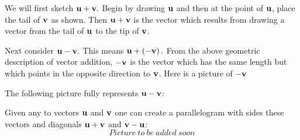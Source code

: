 \begin{solution}
We will first sketch ${\bf u}+{\bf v}.$ Begin by drawing ${\bf u}$
and then at the point of ${\bf u}$, place the tail of ${\bf v}$ as
shown. Then ${\bf u}+{\bf v}$ is the vector which results from
drawing a vector from the tail of ${\bf u}$ to the tip of ${\bf v}$.

\begin{center}
\end{center}

Next consider ${\bf u}-{\bf v}.$ This means ${\bf u}+\left( -{\bf v}
\right) .$ From the above geometric description of vector addition, $-{\bf v}$ 
is the vector which has the same length but which points in the
opposite direction to ${\bf v}$. Here is a picture of $-{\bf v}$ 

\begin{center}
\end{center}

The following picture fully represents ${\bf u}-{\bf v}$:

\begin{center}
\end{center}
\end{solution}

Given any to vectors ${\bf u}$ and ${\bf v}$ one can create a parallelogram with sides these vectors and diagonals ${\bf u}+{\bf v}$ and ${\bf v}-{\bf u}$: $$Picture \ to \ be \ added \ soon$$